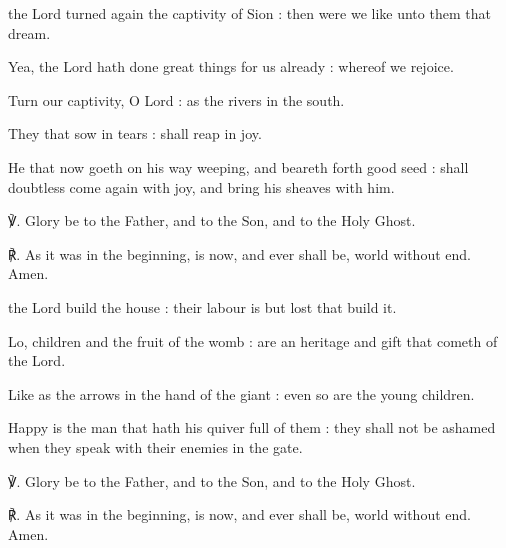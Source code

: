 
 the Lord turned again the captivity of Sion : then were we like unto them that dream.\par
{}
Yea, the Lord hath done great things for us already : whereof we rejoice.\par
{}Turn our captivity, O Lord : as the rivers in the south.\par
{}They that sow in tears : shall reap in joy.\par
{}He that now goeth on his way weeping, and beareth forth good seed : shall doubtless come again with joy, and bring his sheaves with him.\par
℣. Glory be to the Father, and to the Son, and to the Holy Ghost.\par
℟. As it was in the beginning, is now, and ever shall be, world without end. Amen.


 the Lord build the house : their labour is but lost that build it.\par
{}
Lo, children and the fruit of the womb : are an heritage and gift that cometh of the Lord.\par
{}Like as the arrows in the hand of the giant : even so are the young children.\par
{}Happy is the man that hath his quiver full of them : they shall not be ashamed when they speak with their enemies in the gate.\par
℣. Glory be to the Father, and to the Son, and to the Holy Ghost.\par
℟. As it was in the beginning, is now, and ever shall be, world without end. Amen.


